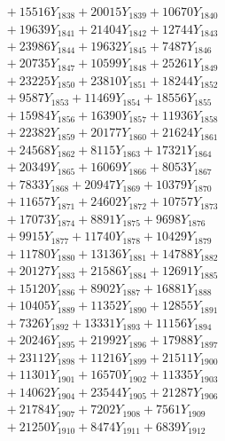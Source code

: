 \documentclass[a4paper,10pt]{article}
\begin{document}
{\begin{align}
&\;  + 15516 Y_{1838} + 20015 Y_{1839} + 10670 Y_{1840} \\[0.3ex]
&\;  + 19639 Y_{1841} + 21404 Y_{1842} + 12744 Y_{1843} \\[0.3ex]
&\;  + 23986 Y_{1844} + 19632 Y_{1845} + 7487 Y_{1846} \\[0.3ex]
&\;  + 20735 Y_{1847} + 10599 Y_{1848} + 25261 Y_{1849} \\[0.3ex]
&\;  + 23225 Y_{1850} + 23810 Y_{1851} + 18244 Y_{1852} \\[0.3ex]
&\;  + 9587 Y_{1853} + 11469 Y_{1854} + 18556 Y_{1855} \\[0.3ex]
&\;  + 15984 Y_{1856} + 16390 Y_{1857} + 11936 Y_{1858} \\[0.5ex]\allowbreak
&\;  + 22382 Y_{1859} + 20177 Y_{1860} + 21624 Y_{1861} \\[0.3ex]
&\;  + 24568 Y_{1862} + 8115 Y_{1863} + 17321 Y_{1864} \\[0.3ex]
&\;  + 20349 Y_{1865} + 16069 Y_{1866} + 8053 Y_{1867} \\[0.3ex]
&\;  + 7833 Y_{1868} + 20947 Y_{1869} + 10379 Y_{1870} \\[0.3ex]
&\;  + 11657 Y_{1871} + 24602 Y_{1872} + 10757 Y_{1873} \\[0.3ex]
&\;  + 17073 Y_{1874} + 8891 Y_{1875} + 9698 Y_{1876} \\[0.3ex]
&\;  + 9915 Y_{1877} + 11740 Y_{1878} + 10429 Y_{1879} \\[0.3ex]
&\;  + 11780 Y_{1880} + 13136 Y_{1881} + 14788 Y_{1882} \\[0.3ex]
&\;  + 20127 Y_{1883} + 21586 Y_{1884} + 12691 Y_{1885} \\[0.3ex]
&\;  + 15120 Y_{1886} + 8902 Y_{1887} + 16881 Y_{1888} \\[0.5ex]\allowbreak
&\;  + 10405 Y_{1889} + 11352 Y_{1890} + 12855 Y_{1891} \\[0.3ex]
&\;  + 7326 Y_{1892} + 13331 Y_{1893} + 11156 Y_{1894} \\[0.3ex]
&\;  + 20246 Y_{1895} + 21992 Y_{1896} + 17988 Y_{1897} \\[0.3ex]
&\;  + 23112 Y_{1898} + 11216 Y_{1899} + 21511 Y_{1900} \\[0.3ex]
&\;  + 11301 Y_{1901} + 16570 Y_{1902} + 11335 Y_{1903} \\[0.3ex]
&\;  + 14062 Y_{1904} + 23544 Y_{1905} + 21287 Y_{1906} \\[0.3ex]
&\;  + 21784 Y_{1907} + 7202 Y_{1908} + 7561 Y_{1909} \\[0.3ex]
&\;  + 21250 Y_{1910} + 8474 Y_{1911} + 6839 Y_{1912} \\[0.3ex]

\end{align}}
\end{document}

